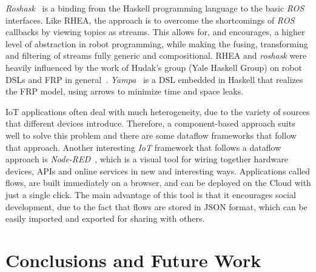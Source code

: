 \documentclass[sigplan,screen]{acmart}
\begin{document}
\textit{Roshask}~\cite{roshask} is a binding from the Haskell programming language
to the basic \textit{ROS} interfaces. Like \textsc{RHEA}, the approach is to
overcome the shortcomings of \textit{ROS} callbacks by viewing topics as
streams. This allows for, and encourages, a higher level of abstraction in
robot programming, while making the fusing, transforming and filtering of
streams fully generic and compositional.
\textsc{RHEA} and \textit{roshask} were heavily influenced by the work of Hudak's
group (Yale Haskell Group) on robot DSLs and FRP in general~\cite{fran,arrows_robots,lambda_in_motion}.
\textit{Yampa}~\cite{arrows_robots} is a DSL embedded in Haskell
that realizes the FRP model, using arrows to minimize time and space leaks.


IoT applications often deal with much heterogeneity, due to the variety of
sources that different devices introduce. Therefore, a component-based approach
suits well to solve this problem and there are some dataflow frameworks that
follow that approach.
Another interesting \textit{IoT} framework that follows a dataflow
approach is \textit{Node-RED}~\cite{iot_dataflow}, which is a visual tool for wiring
together hardware devices, APIs and online services in new and interesting ways.
Applications called flows, are built immediately on a browser, and can be
deployed on the Cloud with just a single click. The main advantage of this tool
is that it encourages social development, due to the fact that flows are stored
in JSON format, which can be easily imported and exported for sharing with
others.

\section{Conclusions and Future Work} \label{sec:conclusions}
\end{document}
